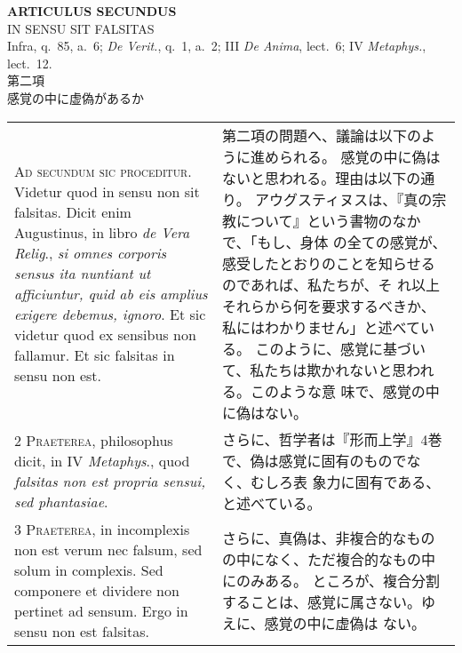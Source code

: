 \documentclass[10pt]{jsarticle} %
\begin{document}
\newpage

\begin{center}
 {\Large {\bf ARTICULUS SECUNDUS}}\\
 {\large IN SENSU SIT FALSITAS}\\
 {\footnotesize Infra, q.~85, a.~6; {\itshape De Verit.}, q.~1, a.~2;
 III {\itshape De Anima}, lect.~6; IV {\itshape Metaphys.}, lect.~12.}\\
 {\Large 第二項\\感覚の中に虚偽があるか}
\end{center}

\begin{longtable}{p{21em}p{21em}}

{\huge A}{\scshape d secundum sic proceditur}. Videtur quod in sensu
non sit falsitas. Dicit enim Augustinus, in libro {\itshape de Vera Relig}., {\itshape si
omnes corporis sensus ita nuntiant ut afficiuntur, quid ab eis amplius
exigere debemus, ignoro}. Et sic videtur quod ex sensibus non
fallamur. Et sic falsitas in sensu non est.


&


第二項の問題へ、議論は以下のように進められる。
感覚の中に偽はないと思われる。理由は以下の通り。
アウグスティヌスは、『真の宗教について』という書物のなかで、「もし、身体
 の全ての感覚が、感受したとおりのことを知らせるのであれば、私たちが、そ
 れ以上それらから何を要求するべきか、私にはわかりません」と述べている。
 このように、感覚に基づいて、私たちは欺かれないと思われる。このような意
 味で、感覚の中に偽はない。 

\\


{\scshape 2 Praeterea}, philosophus dicit, in IV {\itshape Metaphys}., quod
{\itshape falsitas non est propria sensui, sed phantasiae}.


&
さらに、哲学者は『形而上学』4巻で、偽は感覚に固有のものでなく、むしろ表
 象力に固有である、と述べている。

\\


{\scshape 3 Praeterea}, in incomplexis non est verum nec falsum, sed
solum in complexis. Sed componere et dividere non pertinet ad
sensum. Ergo in sensu non est falsitas.


&

さらに、真偽は、非複合的なものの中になく、ただ複合的なもの中にのみある。
 ところが、複合分割することは、感覚に属さない。ゆえに、感覚の中に虚偽は
 ない。

\\



\end{longtable}
\end{document}
